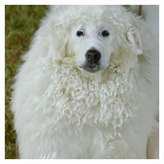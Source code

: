 \documentclass{article}
\begin{document}
\begin{figure}
\begin{subfigure}[b]{0.19\linewidth}
    \end{subfigure}
    \begin{subfigure}[b]{0.19\linewidth}
    \includegraphics[width=\linewidth]{figures/imagenet256/solver_samples/imagenet256_fm_ot_06_50.png}
    \end{subfigure}\\
    

\end{figure}
\end{document}

